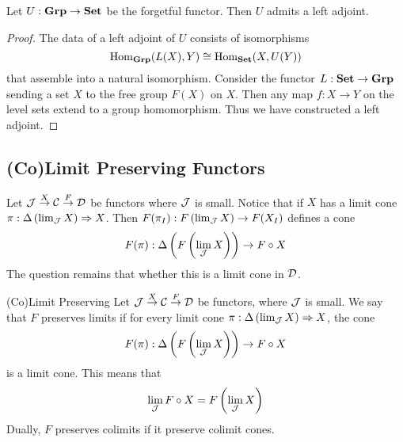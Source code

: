 \documentclass[a4paper]{article}
\begin{document}
\begin{prp}{}{} Let $U:\bold{Grp}\to\bold{Set}$ be the forgetful functor. Then $U$ admits a left adjoint. \tcbline
\begin{proof}
The data of a left adjoint of $U$ consists of isomorphisms $$\operatorname{Hom}_\bold{Grp}(L(X),Y)\cong\operatorname{Hom}_\bold{Set}(X,U(Y))$$ that assemble into a natural isomorphism. Consider the functor $L:\bold{Set}\to\bold{Grp}$ sending a set $X$ to the free group $F(X)$ on $X$. Then any map $f:X\to Y$ on the level sets extend to a group homomorphism. Thus we have constructed a left adjoint. 
\end{proof}
\end{prp}

\subsection{(Co)Limit Preserving Functors}
Let $\mathcal{J}\overset{X}{\to}\mathcal{C}\overset{F}{\to}\mathcal{D}$ be functors where $\mathcal{J}$ is small. Notice that if $X$ has a limit cone $\pi:\Delta\left(\lim_{\mathcal{J}} X\right)\Rightarrow X$. Then $F(\pi_I):F\left(\lim_{\mathcal{J}} X\right)\to F(X_I)$ defines a cone $$F(\pi):\Delta\left(F\left(\lim_{\mathcal{J}} X\right)\right)\to F\circ X$$ 
The question remains that whether this is a limit cone in $\mathcal{D}$. 

\begin{defn}{(Co)Limit Preserving}{} Let $\mathcal{J}\overset{X}{\to}\mathcal{C}\overset{F}{\to}\mathcal{D}$ be functors, where $\mathcal{J}$ is small. We say that $F$ preserves limits if for every limit cone $\pi:\Delta\left(\lim_{\mathcal{J}} X\right)\Rightarrow X$, the cone $$F(\pi):\Delta\left(F\left(\lim_{\mathcal{J}} X\right)\right)\to F\circ X$$ is a limit cone. This means that $$\lim_{\mathcal{J}} F\circ X=F\left(\lim_{\mathcal{J}} X\right)$$ Dually, $F$ preserves colimits if it preserve colimit cones. 
\end{defn}
\end{document}
